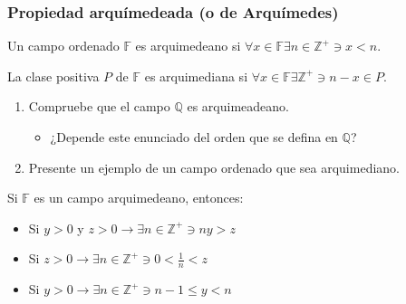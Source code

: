 \subsubsection{Propiedad arquímedeada (o de Arquímedes)}
\begin{definition}
Un campo ordenado $\mathbb{F}$ es arquimedeano si $\forall x \in \mathbb{F}\exists n\in \mathbb{Z}^+\ni x<n$.
\end{definition}

\begin{remark}
La clase positiva $P$ de $\mathbb{F}$ es arquimediana si $\forall x\in \mathbb{F}\exists \mathbb{Z}^+\ni n-x\in P.$ 
\end{remark}

\begin{kaobox}[frametitle=Ejercicios]
\begin{enumerate}
    \item Compruebe que el campo $\mathbb{Q}$ es arquimeadeano. 
    \begin{itemize}
        \item ¿Depende este enunciado del orden que se defina en $\mathbb{Q}$?
    \end{itemize}
    \item Presente un ejemplo de un campo ordenado que sea arquimediano. 
\end{enumerate}
\end{kaobox}

\begin{theorem}
Si $\mathbb{F}$ es un campo arquimedeano, entonces: 
\begin{itemize}
    \item Si $y>0$ y $z>0\to\exists n\in \mathbb{Z}^+\ni ny>z$
    \item Si $z>0\to \exists n \in \mathbb{Z}^+\ni 0<\frac{1}{n}<z$
    \item Si $y>0\to \exists n \in \mathbb{Z}^+\ni n-1\leq y< n$
\end{itemize}
\end{theorem}

